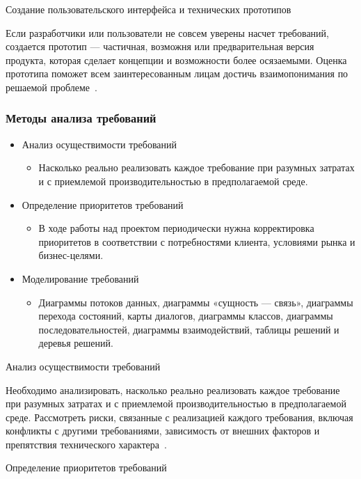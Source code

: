 \documentclass{../industrial-development}
\begin{document}
\alert{Создание пользовательского интерфейса и технических прототипов}

Если разработчики или пользователи не совсем уверены насчет требований, создается прототип — частичная, возможня или предварительная версия продукта, которая сделает концепции и возможности более осязаемыми. Оценка прототипа поможет всем заинтересованным лицам достичь взаимопонимания по решаемой проблеме~\cite[с.~48]{Wiegers}.


\begin{frame} \frametitle{Методы анализа требований}
\begin{itemize}
\item  \alert{Анализ осуществимости требований} 
\begin{itemize}
\item Насколько реально реализовать каждое требование при разумных затратах и с приемлемой производительностью в предполагаемой среде.
\end{itemize}
\item \alert{Определение приоритетов требований} 
\begin{itemize}
\item В ходе работы над проектом периодически нужна корректировка приоритетов
в соответствии с потребностями клиента, условиями рынка и бизнес-целями.
\end{itemize}
\item \alert{Моделирование требований} 
\begin{itemize}
\item Диаграммы потоков данных, диаграммы «сущность — связь», диаграммы перехода состояний, карты диалогов, диаграммы классов, диаграммы последовательностей, диаграммы взаимодействий, таблицы решений и деревья решений.
\end{itemize}
\end{itemize}
\end{frame}

\lecturenotes

\alert{Анализ осуществимости требований}

Необходимо анализировать, насколько реально реализовать каждое требование при разумных затратах и с приемлемой производительностью в предполагаемой среде. Рассмотреть риски, связанные с реализацией каждого требования, включая конфликты с другими требованиями, зависимость от внешних факторов и препятствия технического характера~\cite[с.~48]{Wiegers}.

\alert{Определение приоритетов требований}
\end{document}
